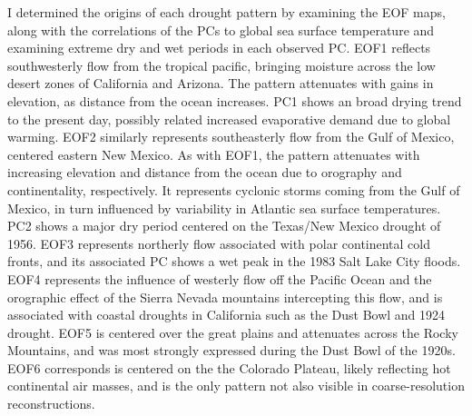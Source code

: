 \documentclass[10pt]{iopart}
\begin{document}
I determined the origins of each drought pattern by examining the EOF maps, along with the correlations of the PCs to global sea surface temperature and examining extreme dry and wet periods in each observed PC. EOF1 reflects southwesterly flow from the tropical pacific, bringing moisture across the low desert zones of California and Arizona. The pattern attenuates with gains in elevation, as distance from the ocean increases. PC1 shows an broad drying trend to the present day, possibly related increased evaporative demand due to global warming. EOF2 similarly represents southeasterly flow from the Gulf of Mexico, centered eastern New Mexico. As with EOF1, the pattern attenuates with increasing elevation and distance from the ocean due to orography and continentality, respectively. It represents cyclonic storms coming from the Gulf of Mexico, in turn influenced by variability in Atlantic sea surface temperatures. PC2 shows a major dry period centered on the Texas/New Mexico drought of 1956. EOF3 represents northerly flow associated with polar continental cold fronts, and its associated PC shows a wet peak in the 1983 Salt Lake City floods. EOF4 represents the influence of westerly flow off the Pacific Ocean and the orographic effect of the Sierra Nevada mountains intercepting this flow, and is associated with coastal droughts in California such as the Dust Bowl and 1924 drought. EOF5 is centered over the great plains and attenuates across the Rocky Mountains, and was most strongly expressed during the Dust Bowl of the 1920s. EOF6 corresponds is centered on the the Colorado Plateau, likely reflecting hot continental air masses, and is the only pattern not also visible in coarse-resolution reconstructions.


\end{document}
